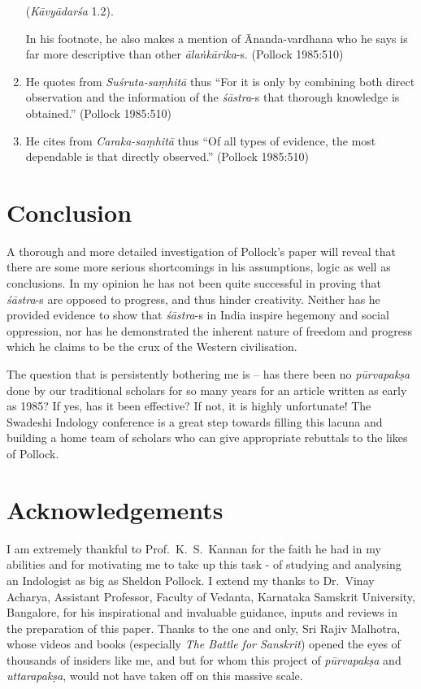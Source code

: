 \begin{enumerate}
\hfill (\textsl{Kāvyādarśa} 1.2).

In his footnote, he also makes a mention of Ānanda-vardhana who he says is far more descriptive than other {\it ālaṅkārika}-s. (Pollock 1985:510)

\item He quotes from \textsl{Suśruta-saṃhitā} thus ``For it is only by combining both direct observation and the information of the {\it śāstra}-s that thorough knowledge is obtained.'' (Pollock 1985:510)

\item He cites from \textsl{Caraka-saṃhitā} thus ``Of all types of evidence, the most dependable is that directly observed.'' (Pollock 1985:510)
\end{enumerate}

\section*{Conclusion}

A thorough and more detailed investigation of Pollock's paper will reveal that there are some more serious shortcomings in his assumptions, logic as well as conclusions. In my opinion he has not been quite successful in proving that {\it śāstra}-s are opposed to progress, and thus hinder creativity. Neither has he provided evidence to show that {\it śāstra}-s in India inspire hegemony and social oppression, nor has he demonstrated the inherent nature of freedom and progress which he claims to be the crux of the Western civilisation.

The question that is persistently bothering me is -- has there been no {\it pūrvapakṣa} done by our traditional scholars for so many years for an article written as early as 1985? If yes, has it been effective? If not, it is highly unfortunate! The Swadeshi Indology conference is a great step towards filling this lacuna and building a home team of scholars who can give appropriate rebuttals to the likes of Pollock.

\section*{Acknowledgements}

I am extremely thankful to Prof.~K.~S.~Kannan for the faith he had in my abilities and for motivating me to take up this task - of studying and analysing an Indologist as big as Sheldon Pollock. I extend my thanks to Dr.~Vinay Acharya, Assistant Professor, Faculty of Vedanta, Karnataka Samskrit University, Bangalore, for his inspirational and invaluable guidance, inputs and reviews in the preparation of this paper. Thanks to the one and only, Sri Rajiv Malhotra, whose videos and books (especially \textsl{The Battle for Sanskrit}) opened the eyes of thousands of insiders like me, and but for whom this project of {\it pūrvapakṣa} and {\it uttarapakṣa}, would not have taken off on this massive scale.

